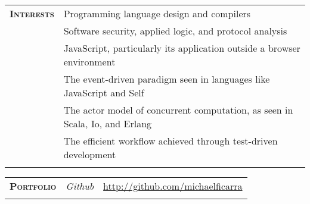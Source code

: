 \documentclass{report}
\newcommand{\sectiontitle}[1]{{\large \textsc{\textbf{#1}}}}
\newcommand{\gutterwidth}[0]{3.3cm}
\newcommand{\extralinespacing}[0]{0.15cm}
\begin{document}
\begin{tabular}{@{}p{\gutterwidth}p{13cm}@{}}
  \sectiontitle{Interests}
      &  Programming language design and compilers \\[\extralinespacing]
  {}  &  Software security, applied logic, and protocol analysis \\[\extralinespacing]
  {}  &  JavaScript, particularly its application outside a browser environment \\[\extralinespacing]
  {}  &  The event-driven paradigm seen in languages like JavaScript and Self \\[\extralinespacing]
  {}  &  The actor model of concurrent computation, as seen in Scala, Io, and Erlang \\[\extralinespacing]
  {}  &  The efficient workflow achieved through test-driven development \\
  \\
\end{tabular}

\begin{tabular}{@{}p{\gutterwidth}p{1.5cm}p{11.5cm}@{}}
  \sectiontitle{Portfolio}  &  {\em Github}  &  \url{http://github.com/michaelficarra} \\
  \\
\end{tabular}

\end{document}
